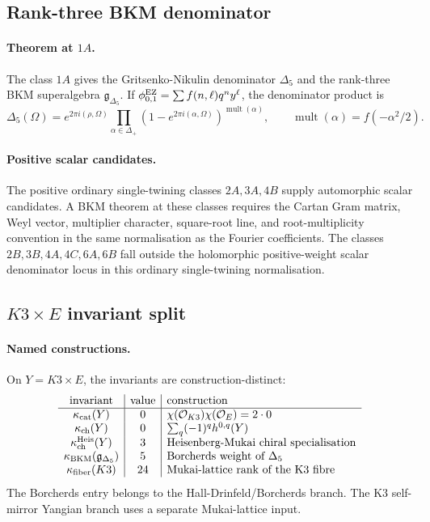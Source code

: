 \subsection*{Rank-three BKM denominator}

\paragraph{Theorem at \(1A\).}
The class \(1A\) gives the Gritsenko-Nikulin denominator \(\Delta_5\)
and the rank-three BKM superalgebra \(\mathfrak g_{\Delta_5}\).  If
\(\phi_{0,1}^{\mathrm{EZ}}=\sum f(n,\ell)q^n y^\ell\), the denominator product is
\[
  \Delta_5(\Omega)=
  e^{2\pi i(\rho,\Omega)}
  \prod_{\alpha\in\Delta_+}
  \left(1-e^{2\pi i(\alpha,\Omega)}\right)^{\operatorname{mult}(\alpha)},
  \qquad
  \operatorname{mult}(\alpha)=f(-\alpha^2/2).
\]

\paragraph{Positive scalar candidates.}
The positive ordinary single-twining classes \(2A,3A,4B\) supply
automorphic scalar candidates.  A BKM theorem at these classes requires
the Cartan Gram matrix, Weyl vector, multiplier character, square-root
line, and root-multiplicity convention in the same normalisation as the
Fourier coefficients.  The classes \(2B,3B,4A,4C,6A,6B\) fall outside
the holomorphic positive-weight scalar denominator locus in this
ordinary single-twining normalisation.

\subsection*{\(K3\times E\) invariant split}

\paragraph{Named constructions.}
On \(Y=K3\times E\), the invariants are construction-distinct:
\[
\begin{array}{c|c|l}
\text{invariant} & \text{value} & \text{construction}\\ \hline
\kappa_{\mathrm{cat}}(Y) & 0 & \chi(\mathcal O_{K3})\chi(\mathcal O_E)=2\cdot0\\
\kappa_{\mathrm{ch}}(Y) & 0 & \sum_q(-1)^q h^{0,q}(Y)\\
\kappa_{\mathrm{ch}}^{\mathrm{Heis}}(Y) & 3 & \text{Heisenberg-Mukai chiral specialisation}\\
\kappa_{\mathrm{BKM}}(\mathfrak g_{\Delta_5}) & 5 & \text{Borcherds weight of }\Delta_5\\
\kappa_{\mathrm{fiber}}(K3) & 24 & \text{Mukai-lattice rank of the K3 fibre}
\end{array}
\]
The Borcherds entry belongs to the Hall-Drinfeld/Borcherds branch.  The
K3 self-mirror Yangian branch uses a separate Mukai-lattice input.

